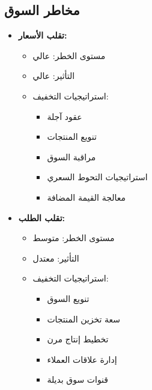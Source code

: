 \subsection{مخاطر السوق}
\begin{itemize}
    \item \textbf{تقلب الأسعار:}
    \begin{itemize}
        \item مستوى الخطر: عالي
        \item التأثير: عالي
        \item استراتيجيات التخفيف:
        \begin{itemize}
            \item عقود آجلة
            \item تنويع المنتجات
            \item مراقبة السوق
            \item استراتيجيات التحوط السعري
            \item معالجة القيمة المضافة
        \end{itemize}
    \end{itemize}
    
    \item \textbf{تقلب الطلب:}
    \begin{itemize}
        \item مستوى الخطر: متوسط
        \item التأثير: معتدل
        \item استراتيجيات التخفيف:
        \begin{itemize}
            \item تنويع السوق
            \item سعة تخزين المنتجات
            \item تخطيط إنتاج مرن
            \item إدارة علاقات العملاء
            \item قنوات سوق بديلة
        \end{itemize}
    \end{itemize}
\end{itemize}

